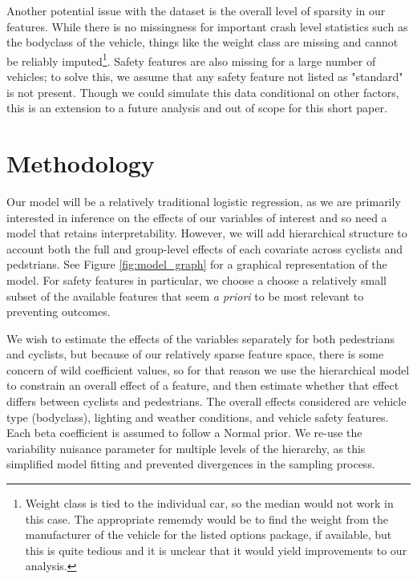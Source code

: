 \documentclass[12pt]{article}
\begin{document}
Another potential issue with the dataset is the overall level of sparsity in our features. While there is no
missingness for important crash level statistics such as the bodyclass of the vehicle, things like the weight class
are missing and cannot be reliably imputed\footnote{
    Weight class is tied to the individual car, so the median would not work in this case. The appropriate rememdy would be to  
    find the weight from the manufacturer of the vehicle for the listed options package, if available, but this is quite 
    tedious and it is unclear that it would yield improvements to our analysis.}. 
Safety features are also missing for a large number of vehicles; to solve
this, we assume that any safety feature not listed as "standard" is not present. Though we could simulate this data
conditional on other factors, this is an extension to a future analysis and out of scope for this short paper.

\section{Methodology}

Our model will be a relatively traditional logistic regression, as we are primarily interested in inference on the
effects of our variables of interest and so need a model that retains interpretability. However, we will
add hierarchical structure to account both the full and group-level effects of each covariate across
cyclists and pedstrians. See Figure \ref{fig:model_graph} for a graphical representation of the model. For safety
features in particular, we choose a choose a relatively small subset of the available features that seem 
\textit{a priori} to be most relevant to preventing outcomes. 

We wish to estimate the effects of the variables separately for both pedestrians and cyclists, but because of our
relatively sparse feature space, there is some concern of wild coefficient values, so for that reason we use the
hierarchical model to constrain an overall effect of a feature, and then estimate whether that effect differs
between cyclists and pedestrians. The overall effects considered are vehicle type (bodyclass), lighting and weather
conditions, and vehicle safety features. Each beta coefficient is assumed to follow a Normal prior. We re-use the
variability nuisance parameter for multiple levels of the hierarchy, as this simplified model fitting and prevented
divergences in the sampling process.
\end{document}
